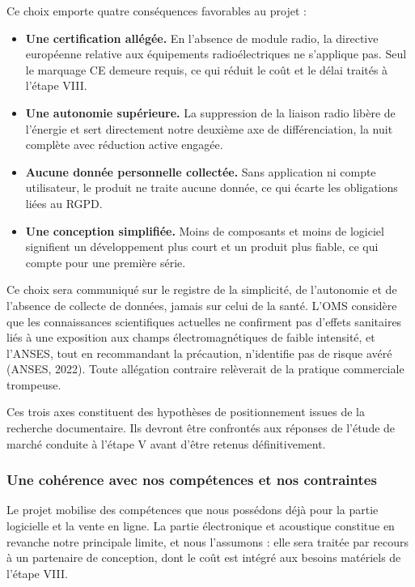 Ce choix emporte quatre conséquences favorables au projet :

\begin{itemize}
  \item \textbf{Une certification allégée.} En l'absence de module radio, la
        directive européenne relative aux équipements radioélectriques ne
        s'applique pas. Seul le marquage CE demeure requis, ce qui réduit le
        coût et le délai traités à l'étape VIII.
  \item \textbf{Une autonomie supérieure.} La suppression de la liaison radio
        libère de l'énergie et sert directement notre deuxième axe de
        différenciation, la nuit complète avec réduction active engagée.
  \item \textbf{Aucune donnée personnelle collectée.} Sans application ni
        compte utilisateur, le produit ne traite aucune donnée, ce qui écarte
        les obligations liées au RGPD.
  \item \textbf{Une conception simplifiée.} Moins de composants et moins de
        logiciel signifient un développement plus court et un produit plus
        fiable, ce qui compte pour une première série.
\end{itemize}

\begin{hypothese}
Ce choix sera communiqué sur le registre de la simplicité, de l'autonomie et de
l'absence de collecte de données, jamais sur celui de la santé. L'OMS considère
que les connaissances scientifiques actuelles ne confirment pas d'effets
sanitaires liés à une exposition aux champs électromagnétiques de faible
intensité, et l'ANSES, tout en recommandant la précaution, n'identifie pas de
risque avéré (ANSES, 2022). Toute allégation contraire relèverait de la pratique
commerciale trompeuse.
\end{hypothese}

\begin{hypothese}
Ces trois axes constituent des hypothèses de positionnement issues de la
recherche documentaire. Ils devront être confrontés aux réponses de l'étude de
marché conduite à l'étape V avant d'être retenus définitivement.
\end{hypothese}

\subsubsection{Une cohérence avec nos compétences et nos contraintes}

Le projet mobilise des compétences que nous possédons déjà pour la partie
logicielle et la vente en ligne. La partie électronique et acoustique constitue
en revanche notre principale limite, et nous l'assumons : elle sera traitée par
recours à un partenaire de conception, dont le coût est intégré aux besoins
matériels de l'étape VIII.

